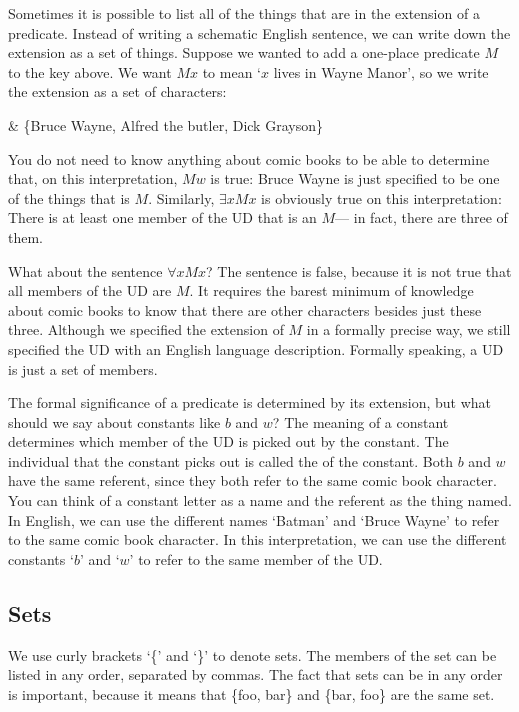 Sometimes it is possible to list all of the things that are in the extension of a predicate. Instead of writing a schematic English sentence, we can write down the extension as a set of things. Suppose we wanted to add a one-place predicate $M$ to the key above. We want $Mx$ to mean `$x$ lives in Wayne Manor', so we write the extension as a set of characters:
\begin{partialmodel}
	 & \{Bruce Wayne, Alfred the butler, Dick Grayson\}
\end{partialmodel}
You do not need to know anything about comic books to be able to determine that, on this interpretation, $Mw$ is true: Bruce Wayne is just specified to be one of the things that is $M$. Similarly, $\exists x Mx$ is obviously true on this interpretation: There is at least one member of the UD that is an $M$--- in fact, there are three of them.



What about the sentence $\forall x  Mx$? The sentence is false, because it is not true that all members of the UD are $M$. It requires the barest minimum of knowledge about comic books to know that there are other characters besides just these three. Although we specified the extension of $M$ in a formally precise way, we still specified the UD with an English language description. Formally speaking, a UD is just a set of members.

The formal significance of a predicate is determined by its extension, but what should we say about constants like $b$ and $w$? The meaning of a constant determines which member of the UD is picked out by the constant. The individual that the constant picks out is called the  of the constant. Both $b$ and $w$ have the same referent, since they both refer to the same comic book character. You can think of a constant letter as a name and the referent as the thing named. In English, we can use the different names `Batman' and `Bruce Wayne' to refer to the same comic book character. In this interpretation, we can use the different constants `$b$' and `$w$' to refer to the same member of the UD.

\subsection{Sets}

We use curly brackets `\{' and `\}' to denote sets. The members of the set can be listed in any order, separated by commas. The fact that sets can be in any order is important, because it means that \{foo, bar\} and \{bar, foo\} are the same set.

